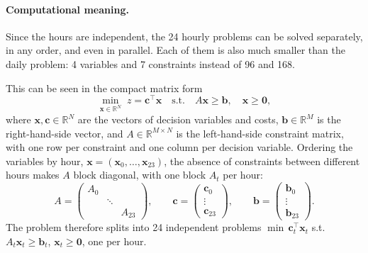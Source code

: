 \paragraph{Computational meaning.}
Since the hours are independent, the 24 hourly problems can be solved separately, in any
order, and even in parallel. Each of them is also much smaller than the daily problem: 4
variables and 7 constraints instead of 96 and 168.

This can be seen in the compact matrix form
\begin{equation}
    \min_{\mathbf{x} \in \mathbb{R}^N} \; z = \mathbf{c}^\top \mathbf{x}
    \quad \text{s.t.} \quad A\mathbf{x} \geq \mathbf{b}, \quad \mathbf{x} \geq \mathbf{0},
\end{equation}
where $\mathbf{x}, \mathbf{c} \in \mathbb{R}^N$ are the vectors of decision variables and
costs, $\mathbf{b} \in \mathbb{R}^M$ is the right-hand-side vector, and
$A \in \mathbb{R}^{M \times N}$ is the left-hand-side constraint matrix, with one row per
constraint and one column per decision variable. Ordering the variables by hour,
$\mathbf{x} = (\mathbf{x}_0, \dots, \mathbf{x}_{23})$, the absence of constraints between
different hours makes $A$ block diagonal, with one block $A_t$ per hour:
\begin{equation}
    A = \begin{pmatrix}
        A_0 & & \\
        & \ddots & \\
        & & A_{23}
    \end{pmatrix},
    \qquad
    \mathbf{c} = \begin{pmatrix} \mathbf{c}_0 \\ \vdots \\ \mathbf{c}_{23} \end{pmatrix},
    \qquad
    \mathbf{b} = \begin{pmatrix} \mathbf{b}_0 \\ \vdots \\ \mathbf{b}_{23} \end{pmatrix}.
\end{equation}
The problem therefore splits into 24 independent problems
$\min \, \mathbf{c}_t^\top \mathbf{x}_t$ s.t. $A_t \mathbf{x}_t \geq \mathbf{b}_t$,
$\mathbf{x}_t \geq \mathbf{0}$, one per hour.

